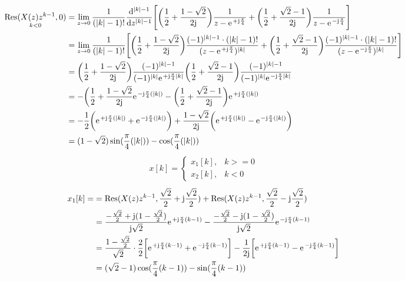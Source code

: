 \begin{align}
	\underset{k<0}{\mathrm{Res}(X(z)z^{k-1},0)}&=\lim\limits_{z\rightarrow0}\frac{1}{(|k|-1)!}\frac{\mathrm{d}^{|k|-1}}{\mathrm{d}z^{|k|-1}}\Bigg[\bigg(\frac{1}{2}+\frac{1-\sqrt{2}}{2\im}\bigg)\frac{1}{z-\e^{+\im\frac{\pi}{4}}}+\bigg(\frac{1}{2}+\frac{\sqrt{2}-1}{2\im}\bigg)\frac{1}{z-\e^{-\im\frac{\pi}{4}}}\Bigg ]\nonumber\\
	&=\lim\limits_{z\rightarrow0}\frac{1}{(|k|-1)!}\Bigg[\bigg( \frac{1}{2}+\frac{1-\sqrt{2}}{2\im}\bigg)\frac{(-1)^{|k|-1}\cdot(|k|-1)!}{(z-\e^{+\im\frac{\pi}{4}})^{|k|}}+\bigg(\frac{1}{2}+\frac{\sqrt{2}-1}{2\im}\bigg)\frac{(-1)^{|k|-1}\cdot(|k|-1)!}{(z-\e^{-\im\frac{\pi}{4}})^{|k|}}\Bigg] \nonumber\\
	&=\bigg(\frac{1}{2}+\frac{1-\sqrt{2}}{2\im}\bigg)\frac{(-1)^{|k|-1}}{(-1)^{|k|}\e^{+\im\frac{\pi}{4}|k|}}\bigg(\frac{1}{2}+\frac{\sqrt{2}-1}{2\im}\bigg)\frac{(-1)^{|k|-1}}{(-1)^{|k|}\e^{-\im\frac{\pi}{4}|k|}}\nonumber\\
	&=-\bigg(\frac{1}{2}+\frac{1-\sqrt{2}}{2\im}\e^{-\im\frac{\pi}{4}(|k|)}-\bigg(\frac{1}{2}+\frac{\sqrt{2}-1}{2\im}\bigg)\e^{+\im\frac{\pi}{4}(|k|)}\nonumber\\
	&=-\frac{1}{2}\bigg(\e^{+\im\frac{\pi}{4}(|k|)}+\e^{-\im\frac{\pi}{4}(|k|)}\bigg)+\frac{1-\sqrt{2}}{2\im}\bigg(\e^{+\im\frac{\pi}{4}(|k|)}-\e^{-\im\frac{\pi}{4}(|k|)}\bigg) \nonumber\\
	&=(1-\sqrt{2})\sin(\frac{\pi}{4}(|k|))-\cos(\frac{\pi}{4}(|k|))
\end{align}
\begin{align}
	x[k]=\begin{cases}
		x_1[k], &k>=0\\
		x_2[k], &k<0
	\end{cases}
\end{align}
\begin{align}
	x_1[k]=&=\mathrm{Res}(X(z)z^{k-1},\frac{\sqrt{2}}{2}+\im\frac{\sqrt{2}}{2})+\mathrm{Res}(X(z)z^{k-1},\frac{\sqrt{2}}{2}-\im\frac{\sqrt{2}}{2})\nonumber\\
	&=\frac{-\frac{\sqrt{2}}{2}+\im(1-\frac{\sqrt{2}}{2})}{\im\sqrt{2}}\e^{+\im\frac{\pi}{4}(k-1)}-\frac{-\frac{\sqrt{2}}{2}-\im(1-\frac{\sqrt{2}}{2})}{\im\sqrt{2}}\e^{-\im\frac{\pi}{4}(k-1)}\nonumber\\
	&=\frac{1-\frac{\sqrt{2}}{2}}{\sqrt{2}}\cdot\frac{2}{2}\bigg[\e^{+\im\frac{\pi}{4}(k-1)}+\e^{-\im\frac{\pi}{4}(k-1)}\bigg ]-\frac{1}{2\im}\bigg[\e^{+\im\frac{\pi}{4}(k-1)}-\e^{-\im\frac{\pi}{4}(k-1)}\bigg]\nonumber\\
	&=(\sqrt{2}-1)\cos(\frac{\pi}{4}(k-1))-\sin(\frac{\pi}{4}(k-1))
\end{align}

